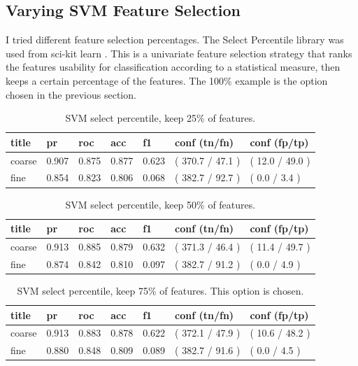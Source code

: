 \documentclass[ms]{nuthesis}
\begin{document}
\subsection{Varying SVM Feature Selection}
\par I tried different feature selection percentages. The Select Percentile library was used from
sci-kit learn \cite{scikit-learn}. This is a univariate feature selection strategy that ranks the
features usability for classification according to a statistical measure, then keeps a certain
percentage of the features. The 100\% example is the option chosen in the previous section.

\FloatBarrier
\begin{table}[H]
\centering
\begin{tabular}{|l||l||l||l||l||l||l|}\toprule
title & pr & roc & acc & f1 & conf (tn/fn) & conf (fp/tp) \\ \midrule
coarse & 0.907 & 0.875 & 0.877 & 0.623 & ( 370.7 / 47.1 ) & ( 12.0 / 49.0 ) \\
fine & 0.854 & 0.823 & 0.806 & 0.068 & ( 382.7 / 92.7 ) & ( 0.0 / 3.4 ) \\ \bottomrule
\end{tabular}
\caption{SVM select percentile, keep 25\% of features.}
\label{tab:SVMSel25}
\end{table}
\FloatBarrier


\FloatBarrier
\begin{table}[H]
\centering
\begin{tabular}{|l||l||l||l||l||l||l|}\toprule
title & pr & roc & acc & f1 & conf (tn/fn) & conf (fp/tp) \\ \midrule
coarse & 0.913 & 0.885 & 0.879 & 0.632 & ( 371.3 / 46.4 ) & ( 11.4 / 49.7 ) \\
fine & 0.874 & 0.842 & 0.810 & 0.097 & ( 382.7 / 91.2 ) & ( 0.0 / 4.9 ) \\ \bottomrule
\end{tabular}
\caption{SVM select percentile, keep 50\% of features.}
\label{tab:SVMSel50}
\end{table}
\FloatBarrier



\FloatBarrier
\begin{table}[H]
\centering
\begin{tabular}{|l||l||l||l||l||l||l|}\toprule
title & pr & roc & acc & f1 & conf (tn/fn) & conf (fp/tp) \\ \midrule
coarse & 0.913 & 0.883 & 0.878 & 0.622 & ( 372.1 / 47.9 ) & ( 10.6 / 48.2 ) \\
fine & 0.880 & 0.848 & 0.809 & 0.089 & ( 382.7 / 91.6 ) & ( 0.0 / 4.5 ) \\ \bottomrule
\end{tabular}
\caption{SVM select percentile, keep 75\% of features. This option is chosen.}
\label{tab:SVMSel75}
\end{table}
\FloatBarrier
\end{document}
